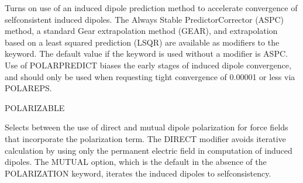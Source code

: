 \documentclass[letterpaper,11pt,english]{sphinxmanual}
\begin{document}
\ignorespaces {}\label{\detokenize{text/keywords:key-polar-predict}}\begin{description}
\sphinxAtStartPar
Turns on use of an induced dipole prediction method to accelerate convergence of self\sphinxhyphen{}consistent induced dipoles. The Always Stable Predictor\sphinxhyphen{}Corrector (ASPC) method, a standard Gear extrapolation method (GEAR), and extrapolation based on a least squared prediction (LSQR) are available as modifiers to the keyword. The default value if the keyword is used without a modifier is ASPC. Use of POLAR\sphinxhyphen{}PREDICT biases the early stages of induced dipole convergence, and should only be used when requesting tight convergence of 0.00001 or less via POLAR\sphinxhyphen{}EPS.

\end{description}

\ignorespaces {}\label{\detokenize{text/keywords:key-polarizable}}
\sphinxAtStartPar
POLARIZABLE

\ignorespaces {}\label{\detokenize{text/keywords:key-polarization}}\begin{description}
\sphinxAtStartPar
Selects between the use of direct and mutual dipole polarization for force fields that incorporate the polarization term. The DIRECT modifier avoids iterative calculation by using only the permanent electric field in computation of induced dipoles. The MUTUAL option, which is the default in the absence of the POLARIZATION keyword, iterates the induced dipoles to self\sphinxhyphen{}consistency.

\end{description}
\end{document}
